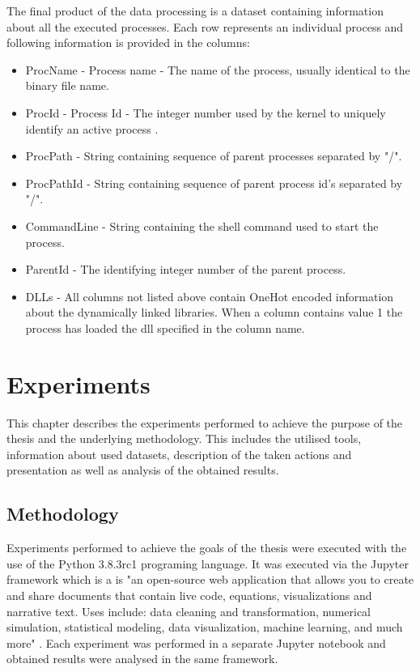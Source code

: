 \documentclass[a4paper,twoside,12pt]{book}
\begin{document}
The final product of the data processing is a dataset containing information about all the 
executed processes. Each row represents an individual process and following information is 
provided in the columns:
\begin{itemize}
	\item ProcName - Process name - The name of the process, usually identical to the binary 
	file name. 
	\item ProcId - Process Id - The integer number used by the kernel to uniquely identify 
	an active process \cite{bib:MicrosoftWinInternals}.
	\item ProcPath - String containing sequence of parent processes separated by "/".
	\item ProcPathId - String containing sequence of parent process id's separated by "/".
	\item CommandLine - String containing the shell command used to start the process.
	\item ParentId - The identifying integer number of the parent process. 
	\item DLLs - All columns not listed above contain OneHot encoded information about the 
	dynamically linked libraries. When a column contains value 1 the process has 
	loaded the dll specified in the column name.
\end{itemize}

\chapter{Experiments}


This chapter describes the experiments performed to achieve the purpose of the thesis
and the underlying methodology. This includes the utilised tools, information about used datasets,
description of the taken actions and presentation as well as analysis of the obtained results. 


\section{Methodology}

Experiments performed to achieve the goals of the thesis were executed with the use of 
the Python 3.8.3rc1 programing language. It was executed via the Jupyter framework which is
a is "an open-source web application that allows you to create and share documents that 
contain live code, equations, visualizations and narrative text. Uses include: data cleaning 
and transformation, numerical simulation, statistical modeling, data visualization, machine 
learning, and much more" \cite{bib:jupyter}. Each experiment was performed in a separate
Jupyter notebook and obtained results were analysed in the same framework. 
\end{document}
